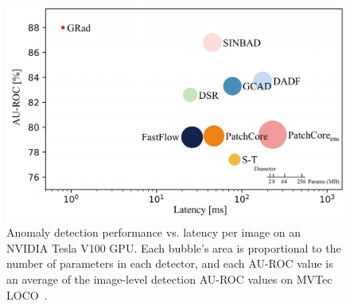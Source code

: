 \documentclass[letterpaper]{article} %
\begin{document}
\begin{figure}[!t]
    \centering
    \includegraphics[width=1\linewidth]{images/speed.pdf}
    \vspace{-0.8cm}
    \caption{Anomaly detection performance vs. latency per image on an NVIDIA Tesla V100 GPU. Each bubble’s area is proportional to the number of parameters in each detector, and each AU-ROC value is an average of the image-level detection AU-ROC values on MVTec LOCO~\cite{MVloco}.}
    \label{fig: speed}
    \vspace{-0.6cm}
\end{figure}
\end{document}
